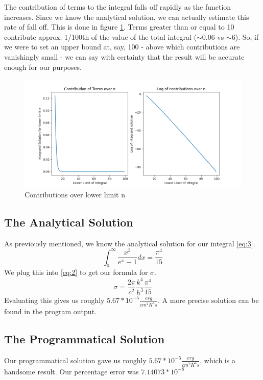 \documentclass{article}
\begin{document}
The contribution of terms to the integral falls off rapidly as the function increases. Since we know the analytical solution, we can actually estimate this rate of fall off. This is done in figure \ref{fig:1}. Terms greater than or equal to 10 contribute approx. 1/100th of the value of the total integral ($\sim$0.06 vs $\sim$6). So, if we were to set an upper bound at, say, 100 - above which contributions are vanishingly small - we can say with certainty that the result will be accurate enough for our purposes. 

\begin{figure}
\includegraphics[width=\linewidth]{Figure_2.png}
  \caption{Contributions over lower limit n}
  \label{fig:1}
\end{figure}

\subsection{The Analytical Solution}
As previously mentioned, we know the analytical solution for our integral \ref{eq:3}. 
\begin{equation}
    \int_{0}^{\infty}\frac{x^{3}}{e^{x}-1}dx = \frac{\pi^4}{15}
\end{equation}
We plug this into \ref{eq:2} to get our formula for $\sigma$.
\begin{equation}
    \sigma = \frac{2\pi}{c^2} \frac{k^4}{h^3}\frac{\pi^4}{15}
\end{equation}
Evaluating this gives us roughly $5.67*10^{-5}\frac{erg}{cm^2 K^4 s}$. A more precise solution can be found in the program output.

\subsection{The Programmatical Solution}
Our programmatical solution gave us roughly $5.67*10^{-5}\frac{erg}{cm^2 K^4 s}$, which is a handsome result. Our percentage error was $7.14073*10^{-8}$
\end{document}
